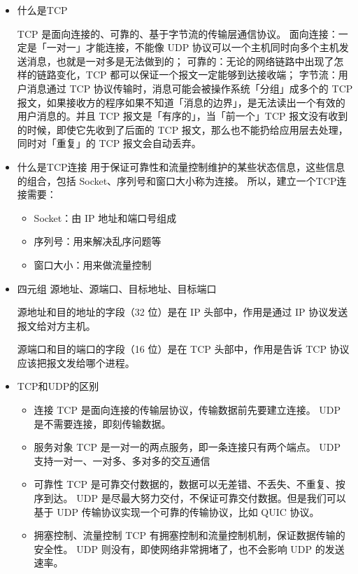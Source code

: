 \documentclass[11pt]{article}
\begin{document}
\begin{itemize}
\item 什么是TCP

TCP 是面向连接的、可靠的、基于字节流的传输层通信协议。
面向连接：一定是「一对一」才能连接，不能像 UDP 协议可以一个主机同时向多个主机发送消息，也就是一对多是无法做到的；
可靠的：无论的网络链路中出现了怎样的链路变化，TCP 都可以保证一个报文一定能够到达接收端；
字节流：用户消息通过 TCP 协议传输时，消息可能会被操作系统「分组」成多个的 TCP 报文，如果接收方的程序如果不知道「消息的边界」，是无法读出一个有效的用户消息的。并且 TCP 报文是「有序的」，当「前一个」TCP 报文没有收到的时候，即使它先收到了后面的 TCP 报文，那么也不能扔给应用层去处理，同时对「重复」的 TCP 报文会自动丢弃。

\item 什么是TCP连接
用于保证可靠性和流量控制维护的某些状态信息，这些信息的组合，包括 Socket、序列号和窗口大小称为连接。
所以，建立一个TCP连接需要：
\begin{itemize}
\item Socket：由 IP 地址和端口号组成

\item 序列号：用来解决乱序问题等

\item 窗口大小：用来做流量控制
\end{itemize}

\item 四元组
源地址、源端口、目标地址、目标端口

源地址和目的地址的字段（32 位）是在 IP 头部中，作用是通过 IP 协议发送报文给对方主机。

源端口和目的端口的字段（16 位）是在 TCP 头部中，作用是告诉 TCP 协议应该把报文发给哪个进程。

\item TCP和UDP的区别
\begin{itemize}
\item 连接
TCP 是面向连接的传输层协议，传输数据前先要建立连接。
UDP 是不需要连接，即刻传输数据。

\item 服务对象
TCP 是一对一的两点服务，即一条连接只有两个端点。
UDP 支持一对一、一对多、多对多的交互通信

\item 可靠性
TCP 是可靠交付数据的，数据可以无差错、不丢失、不重复、按序到达。
UDP 是尽最大努力交付，不保证可靠交付数据。但是我们可以基于 UDP 传输协议实现一个可靠的传输协议，比如 QUIC 协议。

\item 拥塞控制、流量控制
TCP 有拥塞控制和流量控制机制，保证数据传输的安全性。
UDP 则没有，即使网络非常拥堵了，也不会影响 UDP 的发送速率。


\end{itemize}
\end{itemize}
\end{document}
